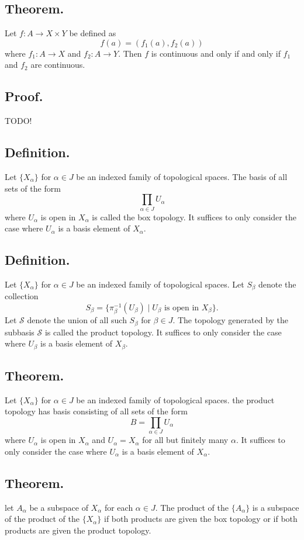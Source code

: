 \documentclass[titlepage]{article}
\begin{document}
\subsection{Theorem.} Let $f: A \to X \times Y$ be defined as 
$$f(a) = (f_{1}(a), f_{2}(a))$$
where $f_{1}: A \to X$ and $f_{2}: A \to Y$. Then $f$ is continuous and only if and only if $f_{1}$ and $f_{2}$ are continuous.

\subsection{Proof.} TODO!

\subsection{Definition.} Let $\{X_{\alpha}\}$ for $\alpha \in J$ be an indexed family of topological spaces. The basis of all sets of the form 
$$\prod_{\alpha \in J} U_{\alpha}$$
where $U_{\alpha}$ is open in $X_{\alpha}$ is called the box topology. It suffices to only consider the case where $U_{\alpha}$ is a basis element of $X_{\alpha}$.

\subsection{Definition.} Let $\{X_{\alpha}\}$ for $\alpha \in J$ be an indexed family of topological spaces. Let $S_{\beta}$ denote the collection 
$$S_{\beta} = \{\pi_{\beta}^{-1}(U_{\beta}) \mid U_{\beta} \text{ is open in } X_{\beta}\}.$$
Let $\mathcal{S}$ denote the union of all such $S_{\beta}$ for $\beta \in J$. The topology generated by the subbasis $\mathcal{S}$ is called the product topology. It suffices to only consider the case where $U_{\beta}$ is a basis element of $X_{\beta}$.

\subsection{Theorem.} Let $\{X_{\alpha}\}$ for $\alpha \in J$ be an indexed family of topological spaces. the product topology has basis consisting of all sets of the form 
$$B = \prod_{\alpha \in J} U_{\alpha}$$
where $U_{\alpha}$ is open in $X_{\alpha}$ and $U_{\alpha} = X_{\alpha}$ for all but finitely many $\alpha$. It suffices to only consider the case where $U_{\alpha}$ is a basis element of $X_{\alpha}$.

\subsection{Theorem.} let $A_{\alpha}$ be a subspace of $X_{\alpha}$ for each $\alpha \in J$. The product of the $\{A_{\alpha}\}$ is a subspace of the product of the $\{X_{\alpha}\}$ if both products are given the box topology or if both products are given the product topology.
\end{document}
